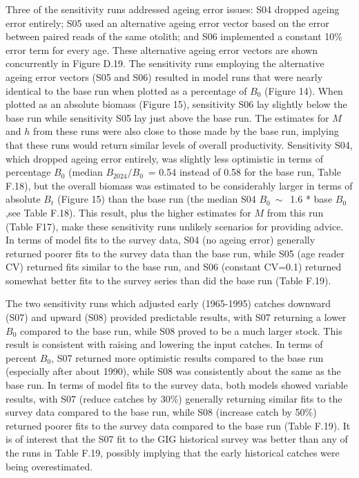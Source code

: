\documentclass[11pt]{book}
\newcommand{\Bcurr}{B_{2024}}
\newcommand{\pc}{\%}
\begin{document}
Three of the sensitivity runs addressed ageing error issues: S04 dropped ageing error entirely; S05 used an alternative ageing error vector based on the error between paired reads of the same otolith; and S06 implemented a constant 10\pc{} error term for every age. 
These alternative ageing error vectors are shown concurrently in Figure D.19. 
The sensitivity runs employing the alternative ageing error vectors (S05 and S06) resulted in model runs that were nearly identical to the base run when plotted as a percentage of $B_0$ (Figure 14). 
When plotted as an absolute biomass (Figure 15), sensitivity S06 lay slightly below the base run while sensitivity S05 lay just above the base run. 
The estimates for $M$ and $h$ from these runs were also close to those made by the base run, implying that these runs would return similar levels of overall productivity.
Sensitivity S04, which dropped ageing error entirely, was slightly less optimistic in terms of percentage $B_0$ (median $\Bcurr/B_0$~= 0.54 instead of 0.58 for the base run, Table F.18), but the overall biomass was estimated to be considerably larger in terms of absolute $B_t$ (Figure 15) than the base run (the median S04 $B_0~\sim$~1.6 * base $B_0$,see Table F.18). 
This result, plus the higher estimates for $M$ from this run (Table F17), make these sensitivity runs unlikely scenarios for providing advice.
In terms of model fits to the survey data, S04 (no ageing error) generally returned poorer fits to the survey data than the base run, while S05 (age reader CV) returned fits similar to the base run, and S06 (constant CV=0.1) returned somewhat better fits to the survey series than did the base run (Table F.19).

The two sensitivity runs which adjusted early (1965-1995) catches downward (S07) and upward (S08) provided predictable results, with S07 returning a lower $B_0$ compared to the base run, while S08 proved to be a much larger stock.
This result is consistent with raising and lowering the input catches. 
In terms of percent $B_0$, S07 returned more optimistic results compared to the base run (especially after about 1990), while S08 was consistently about the same as the base run.
In terms of model fits to the survey data, both models showed variable results, with S07 (reduce catches by 30\pc) generally returning similar fits to the survey data compared to the base run, while S08 (increase catch by 50\pc) returned poorer fits to the survey data compared to the base run (Table F.19). 
It is of interest that the S07 fit to the GIG historical survey was better than any of the runs in Table F.19, possibly implying that the early historical catches were being overestimated.
\end{document}
